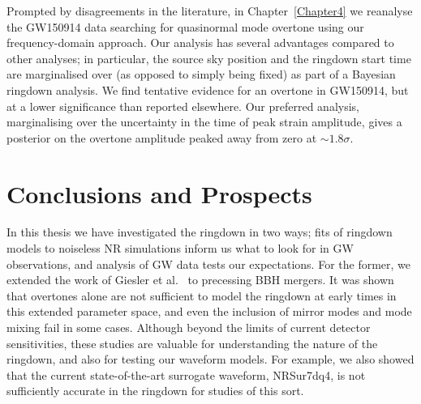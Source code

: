 \documentclass[
12pt, %
english, %
doublespacing, %
headsepline, %
]{MastersDoctoralThesis} %
\begin{document}
\vspace{0.2cm}

\noindent Prompted by disagreements in the literature, in Chapter~\ref{Chapter4} we reanalyse the GW150914 data searching for quasinormal mode overtone using our frequency-domain approach.
Our analysis has several advantages compared to other analyses; in particular, the source sky position and the ringdown start time are marginalised over (as opposed to simply being fixed) as part of a Bayesian ringdown analysis. 
We find tentative evidence for an overtone in GW150914, but at a lower significance than reported elsewhere. 
Our preferred analysis, marginalising over the uncertainty in the time of peak strain amplitude, gives a posterior on the overtone amplitude peaked away from zero at $\sim 1.8 \sigma$.


\mainmatter %

\pagestyle{thesis} %



 

 


\chapter{Conclusions and Prospects}

In this thesis we have investigated the ringdown in two ways; fits of ringdown models to noiseless NR simulations inform us what to look for in GW observations, and analysis of GW data tests our expectations.
For the former, we extended the work of Giesler et al.~\cite{Giesler:2019uxc} to precessing BBH mergers.
It was shown that overtones alone are not sufficient to model the ringdown at early times in this extended parameter space, and even the inclusion of mirror modes and mode mixing fail in some cases.
Although beyond the limits of current detector sensitivities, these studies are valuable for understanding the nature of the ringdown, and also for testing our waveform models.
For example, we also showed that the current state-of-the-art surrogate waveform, NRSur7dq4, is not sufficiently accurate in the ringdown for studies of this sort.
\end{document}
